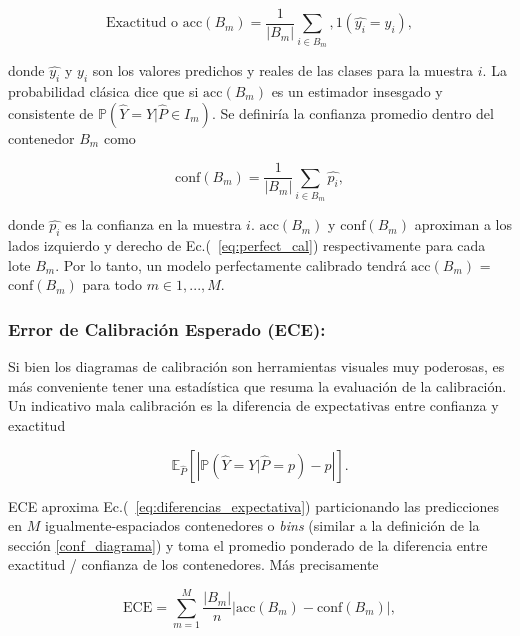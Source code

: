 \documentclass[10pt, oneside, a4paper]{article}
\begin{document}
	\begin{equation}\label{eq:acc_bm}
	\text{Exactitud o acc} (B_{m}) = \frac{1}{\left| B_{m} \right|} \sum_{i \in B_{m}}, 1(\hat{y_{i}} = y_{i}),
	\end{equation}

	donde $\hat{y_{i}}$ y $y_{i}$ son los valores predichos y reales de las clases para la muestra $i$. La probabilidad clásica dice que si $\text{acc}(B_{m})$ es un estimador insesgado y consistente de $\mathbb{P} (\hat{Y} = Y | \hat{P} \in I_{m})$. Se definiría la confianza promedio dentro del contenedor $B_{m}$ como

	\begin{equation}\label{eq:conf_bm}
	\text{conf} (B_{m}) = \frac{1}{\left| B_{m} \right|} \sum_{i \in B_{m}} \hat{p_{i}},
	\end{equation}

	donde $\hat{p_{i}}$ es la confianza en la muestra $i$. $\text{acc} (B_{m})$ y $\text{conf} (B_{m})$ aproximan a los lados izquierdo y derecho de Ec.(~\ref{eq:perfect_cal}) respectivamente para cada lote $B_{m}$. Por lo tanto, un modelo perfectamente calibrado tendrá $\text{acc} (B_{m})$ = $\text{conf} (B_{m})$ para todo $m \in {1,...,M}$.

	\subsubsection{Error de Calibración Esperado (ECE):} \label{error_calibracion_esperado}
	
	Si bien los diagramas de calibración son herramientas visuales muy poderosas, es más conveniente tener una estadística que resuma la evaluación de la calibración. Un indicativo mala calibración es la diferencia de expectativas entre confianza y exactitud
	
	\begin{equation}\label{eq:diferencias_expectativa}
	\mathbb{E}_{\hat{P}} \left[ \left| \mathbb{P} (\hat{Y} = Y | \hat{P} = p) - p \right| \right].
	\end{equation}

	ECE aproxima Ec.(~\ref{eq:diferencias_expectativa}) particionando las predicciones en $M$ igualmente-espaciados contenedores o \textsl{bins} (similar a la definición de la sección \ref{conf_diagrama}) y toma el promedio ponderado de la diferencia entre exactitud / confianza de los contenedores. Más precisamente
	
	\begin{equation}\label{eq:ece}
	\text{ECE} = \sum_{m = 1}^{M} \frac{\left| B_{m} \right|}{n} \left| \text{acc}(B_{m}) - \text{conf}(B_{m}) \right| , 
	\end{equation}	
\end{document}
